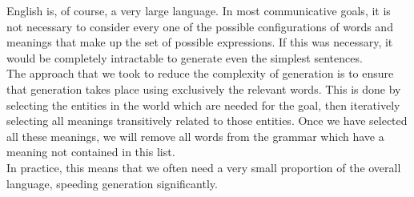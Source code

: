 English is, of course, a very large language.  In most communicative goals, it is
not necessary to consider every one of the possible configurations of words and
meanings that make up the set of possible expressions.  If this was necessary,
it would be completely intractable to generate even the simplest sentences.\\

The approach that we took to reduce the complexity of generation is to ensure that
generation takes place using exclusively the relevant words.  This is done by selecting
the entities in the world which are needed for the goal, then iteratively selecting all
meanings transitively related to those entities.  Once we have selected all these meanings,
we will remove all words from the grammar which have a meaning not contained in this list.\\

In practice, this means that we often need a very small proportion of the overall language,
speeding generation significantly.